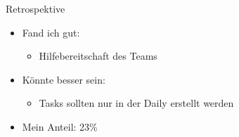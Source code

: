 \begin{frame}{Retrospektive}
	\begin{itemize}
		\item{Fand ich gut:}
		\begin{itemize}
			\item{Hilfebereitschaft des Teams}
		\end{itemize}
		\item{Könnte besser sein:}
		\begin{itemize}
			\item{Tasks sollten nur in der Daily erstellt werden}
		\end{itemize}
		\item{Mein Anteil: 23\%}
	\end{itemize}
\end{frame}